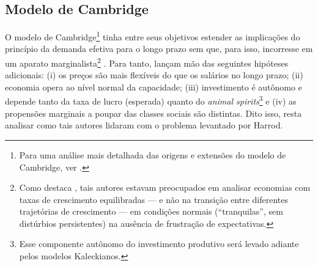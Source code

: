 \subsection{Modelo de Cambridge}


O modelo de Cambridge\footnote{Para uma análise mais detalhada das origens e extensões do modelo de Cambridge, ver \textcite{baranzini_cambridge_2013}.} tinha entre seus objetivos estender as implicações do princípio da demanda efetiva para o longo prazo sem que, para isso, incorresse em um aparato marginalista\footnote{
	Como destaca \textcite[p.~127--133]{davidson_accumulation_1978}, tais autores estavam preocupados em analisar economias com taxas de crescimento equilibradas --- e não na transição entre diferentes trajetórias de crescimento --- em condições normais (``tranquilas'', sem distúrbios persistentes) na ausência de frustração de expectativas.
} \cites{kaldor_alternative_1955}{kaldor_model_1957}{robinson_model_1962}{pasinetti_rate_1962}. Para tanto, lançam mão das seguintes hipóteses adicionais: (i) os preços são mais flexíveis do que os salários no longo prazo; (ii) economia opera ao nível normal da capacidade; (iii) investimento é autônomo e depende tanto da taxa de lucro (esperada) quanto do \textit{animal spirits}\footnote{Esse componente autônomo do investimento produtivo será levado adiante pelos modelos Kaleckianos.} e (iv) as propensões marginais a poupar das classes sociais são distintas. Dito isso, resta analisar como tais autores lidaram com o problema levantado por Harrod.

